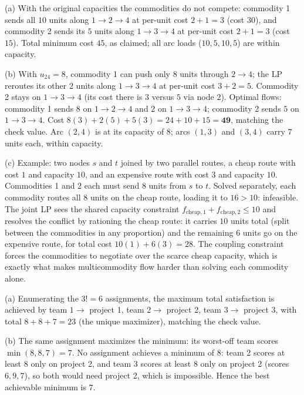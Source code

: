 
(a) With the original capacities the commodities do not compete: commodity 1 sends all $10$ units along $1 \to 2 \to 4$ at per-unit cost $2 + 1 = 3$ (cost $30$), and commodity 2 sends its $5$ units along $1 \to 3 \to 4$ at per-unit cost $2 + 1 = 3$ (cost $15$). Total minimum cost $45$, as claimed; all arc loads ($10, 5, 10, 5$) are within capacity.

(b) With $u_{24} = 8$, commodity 1 can push only $8$ units through $2 \to 4$; the LP reroutes its other $2$ units along $1 \to 3 \to 4$ at per-unit cost $3 + 2 = 5$. Commodity 2 stays on $1 \to 3 \to 4$ (its cost there is $3$ versus $5$ via node 2). Optimal flows: commodity 1 sends $8$ on $1 \to 2 \to 4$ and $2$ on $1 \to 3 \to 4$; commodity 2 sends $5$ on $1 \to 3 \to 4$. Cost $8(3) + 2(5) + 5(3) = 24 + 10 + 15 = \mathbf{49}$, matching the check value. Arc $(2,4)$ is at its capacity of $8$; arcs $(1,3)$ and $(3,4)$ carry $7$ units each, within capacity.

(c) Example: two nodes $s$ and $t$ joined by two parallel routes, a cheap route with cost $1$ and capacity $10$, and an expensive route with cost $3$ and capacity $10$. Commodities 1 and 2 each must send $8$ units from $s$ to $t$. Solved separately, each commodity routes all $8$ units on the cheap route, loading it to $16 > 10$: infeasible. The joint LP sees the shared capacity constraint $f_{\text{cheap},1} + f_{\text{cheap},2} \leq 10$ and resolves the conflict by rationing the cheap route: it carries $10$ units total (split between the commodities in any proportion) and the remaining $6$ units go on the expensive route, for total cost $10(1) + 6(3) = 28$. The coupling constraint forces the commodities to negotiate over the scarce cheap capacity, which is exactly what makes multicommodity flow harder than solving each commodity alone.


(a) Enumerating the $3! = 6$ assignments, the maximum total satisfaction is achieved by team $1 \to$ project 1, team $2 \to$ project 2, team $3 \to$ project 3, with total $8 + 8 + 7 = 23$ (the unique maximizer), matching the check value.

(b) The same assignment maximizes the minimum: its worst-off team scores $\min(8, 8, 7) = 7$. No assignment achieves a minimum of $8$: team 2 scores at least $8$ only on project 2, and team 3 scores at least $8$ only on project 2 (scores $6, 9, 7$), so both would need project 2, which is impossible. Hence the best achievable minimum is $7$.

